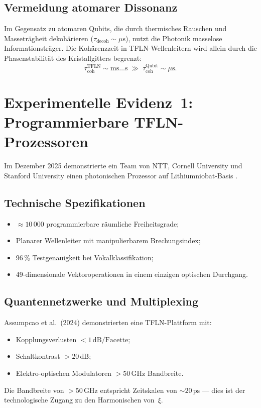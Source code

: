 \subsection{Vermeidung atomarer Dissonanz}

Im Gegensatz zu atomaren Qubits, die durch thermisches Rauschen und
Masseträgheit dekohärieren ($\tau_{\text{decoh}} \sim \mu\text{s}$), nutzt
die Photonik masselose Informationsträger. Die Kohärenzzeit in TFLN-Wellenleitern
wird allein durch die Phasenstabilität des Kristallgitters begrenzt:
\begin{equation}
  \tau_{\text{coh}}^{\text{TFLN}} \sim \text{ms}\ldots\text{s}
  \;\gg\;
  \tau_{\text{coh}}^{\text{Qubit}} \sim \mu\text{s}.
\end{equation}

\section{Experimentelle Evidenz~1: Programmierbare TFLN-Prozessoren}

Im Dezember 2025 demonstrierte ein Team von NTT, Cornell University und
Stanford University einen photonischen Prozessor auf Lithiumniobat-Basis
\cite{NTT2025}.

\subsection{Technische Spezifikationen}

\begin{itemize}
  \item $\approx 10\,000$ programmierbare räumliche Freiheitsgrade;
  \item Planarer Wellenleiter mit manipulierbarem Brechungsindex;
  \item 96\,\% Testgenauigkeit bei Vokalklassifikation;
  \item 49-dimensionale Vektoroperationen in einem einzigen optischen Durchgang.
\end{itemize}

\subsection{Quantennetzwerke und Multiplexing}

Assumpcao et al.\ (2024) \cite{Assumpcao2024} demonstrierten eine
TFLN-Plattform mit:
\begin{itemize}
  \item Kopplungsverlusten $< 1\,\text{dB/Facette}$;
  \item Schaltkontrast $> 20\,\text{dB}$;
  \item Elektro-optischen Modulatoren $> 50\,\text{GHz}$ Bandbreite.
\end{itemize}
Die Bandbreite von $>50\,\text{GHz}$ entspricht Zeitskalen von $\sim 20\,\text{ps}$
— dies ist der technologische Zugang zu den Harmonischen von~$\xi$.

